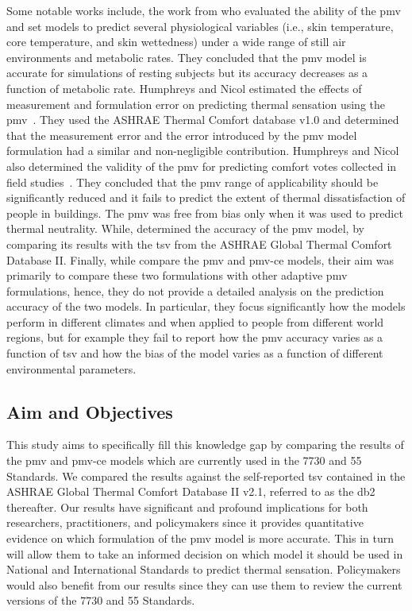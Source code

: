 Some notable works include, the work from  who evaluated the ability of the \ac{pmv} and \ac{set} models to predict several physiological variables (i.e., skin temperature, core temperature, and skin wettedness) under a wide range of still air environments and metabolic rates.
They concluded that the \ac{pmv} model is accurate for simulations of resting subjects but its accuracy decreases as a function of metabolic rate.
Humphreys and Nicol estimated the effects of measurement and formulation error on predicting thermal sensation using the \ac{pmv}~\cite{Humphreys2000}.
They used the ASHRAE Thermal Comfort database v1.0 and determined that the measurement error and the error introduced by the \ac{pmv} model formulation had a similar and non-negligible contribution.
Humphreys and Nicol also determined the validity of the \ac{pmv} for predicting comfort votes collected in field studies~\cite{Humphreys2002}.
They concluded that the \ac{pmv} range of applicability should be significantly reduced and it fails to predict the extent of thermal dissatisfaction of people in buildings.
The \ac{pmv} was free from bias only when it was used to predict thermal neutrality.
While,  determined the accuracy of the \ac{pmv} model, by comparing its results with the \ac{tsv} from the ASHRAE Global Thermal Comfort Database II.
Finally, while  compare the \ac{pmv} and \ac{pmv-ce} models, their aim was primarily to compare these two formulations with other adaptive \ac{pmv} formulations, hence, they do not provide a detailed analysis on the prediction accuracy of the two models.
In particular, they focus significantly how the models perform in different climates and when applied to people from different world regions, but for example they fail to report how the \ac{pmv} accuracy varies as a function of \ac{tsv} and how the bias of the model varies as a function of different environmental parameters.

\subsection{Aim and Objectives}\label{subsec:aim-and-objectives}
This study aims to specifically fill this knowledge gap by comparing the results of the \ac{pmv} and \ac{pmv-ce} models which are currently used in the \gls{7730} and \gls{55} Standards.
We compared the results against the self-reported \ac{tsv} contained in the ASHRAE Global Thermal Comfort Database II v2.1, referred to as the \gls{db2} thereafter.
Our results have significant and profound implications for both researchers, practitioners, and policymakers since it provides quantitative evidence on which formulation of the \ac{pmv} model is more accurate.
This in turn will allow them to take an informed decision on which model it should be used in National and International Standards to predict thermal sensation.
Policymakers would also benefit from our results since they can use them to review the current versions of the \gls{7730} and \gls{55} Standards.